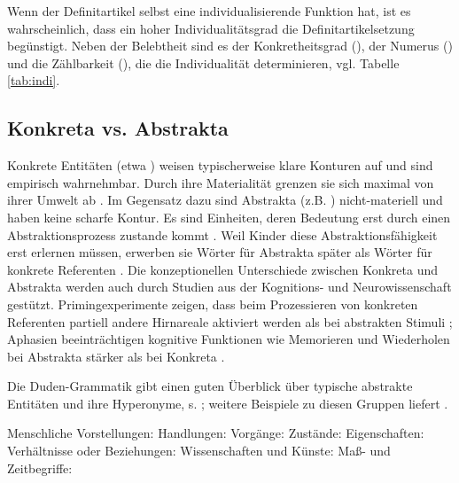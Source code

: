 Wenn der Definitartikel selbst eine individualisierende Funktion hat, ist es wahrscheinlich, dass ein hoher Individualitätsgrad die Definitartikelsetzung begünstigt. Neben der Belebtheit sind es der Konkretheitsgrad (), der Numerus () und die Zählbarkeit (), die 
die Individualität determinieren, vgl. Tabelle \ref{tab:indi}.

\subsection{Konkreta vs. Abstrakta}\label{sec:konabst}

Konkrete Entitäten (etwa ) weisen typischerweise klare Konturen auf und sind empirisch wahrnehmbar. Durch ihre Materialität grenzen sie sich maximal von ihrer Umwelt ab \parencite[344]{Szczepaniak2011}. Im Gegensatz dazu sind Abstrakta (z.B. ) nicht-materiell und haben keine scharfe Kontur. Es sind Einheiten, deren Bedeutung erst durch einen Abstraktionsprozess zustande kommt \parencite[279]{Ewald1992}. Weil Kinder diese Abstraktionsfähigkeit erst erlernen müssen, erwerben sie Wörter für Abstrakta später als Wörter für konkrete Referenten \parencite[396]{Bergelson2013}. Die konzeptionellen Unterschiede zwischen Konkreta und Abstrakta werden auch durch Studien aus der Kognitions- und Neurowissenschaft gestützt. Primingexperimente zeigen, dass beim Prozessieren von konkreten Referenten partiell andere Hirnareale aktiviert werden als bei abstrakten Stimuli \parencite{Binder2005,Weiss2013}; Aphasien beeinträchtigen kognitive Funktionen wie Memorieren und Wiederholen bei Abstrakta stärker als bei Konkreta \parencite{Moss1995,Moss1997}.

Die Duden-Grammatik gibt einen guten Überblick über typische abstrakte Entitäten und ihre Hyperonyme, s.  \parencite[146f.]{Duden2009}; weitere Beispiele zu diesen Gruppen liefert \textcite[143]{Schrauf2011}.

\begin{exe}
	\ex \label{ex:abstrakta}
	\begin{xlist}
		\ex \label{ex:vorstellung} Menschliche Vorstellungen: 
		\ex \label{ex:handlungen} Handlungen: 
		\ex \label{ex:vorgang} Vorgänge: 
		\ex \label{ex:zustand} Zustände: 
		\ex \label{ex:eigenschaft} Eigenschaften: 
		\ex \label{ex:verhaeltnise} Verhältnisse oder Beziehungen: 
		\ex \label{ex:wissenschaft} Wissenschaften und Künste: 
		\ex \label{ex:zeit} Maß- und Zeitbegriffe: 
	\end{xlist}
\end{exe} 

